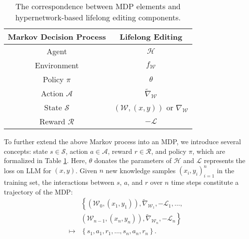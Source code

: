 \begin{table}[t]
\caption{The correspondence between MDP elements and hypernetwork-based lifelong editing components.}
  \label{tab:1}
  \centering
  \begin{tabular}{cc}
    \toprule
    \textbf{Markov Decision Process} & \textbf{Lifelong Editing} \\
    \midrule
    Agent & $\mathcal{H}$ \\
    Environment & $f_\mathcal{W}$ \\
    Policy $\pi$ & $\theta$ \\
    Action $\mathcal{A}$ & $\tilde{\nabla}_\mathcal{W}$ \\
    State $\mathcal{S}$ & $\left(\mathcal{W}, (x, y)\right)$ or $\nabla_{\mathcal{W}}$ \\
    Reward $\mathcal{R}$ & $-\mathcal{L}$ \\
    \bottomrule
  \end{tabular}
\end{table}


To further extend the above Markov process into an MDP, we introduce several concepts: state $s\in\mathcal{S}$, action $a\in\mathcal{A}$, reward $r\in\mathcal{R}$, and policy $\pi$, which are formalized in Table \ref{tab:1}. Here, $\theta$ donates the parameters of $\mathcal{H}$ and $\mathcal{L}$ represents the loss on LLM for $(x, y)$. Given $n$ new knowledge samples $(x_i, y_i)_{i=1}^n$ in the training set, the interactions between $s$, $a$, and $r$ over $n$ time steps constitute a trajectory of the MDP:
\begin{equation}
\begin{aligned}
& \left\{\!\left(\mathcal{W}_0,\left(x_1,y_1\right)\right), {\tilde{\nabla}_{\mathcal{W}_1}}, -\mathcal{L}_1, \dots,\right. \\
& \left.\left(\mathcal{W}_{n-1},\left(x_n,y_n\right)\right), {\tilde{\nabla}_{\mathcal{W}_n}}, -\mathcal{L}_n\!\right\} \\
\mapsto & \left\{s_1, a_1, r_1, \dots, s_n, a_n, r_n\right\}.
\end{aligned}
\end{equation}

